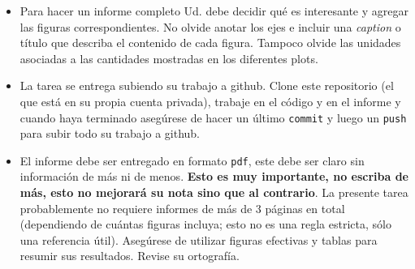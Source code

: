 \documentclass[letter, 11pt]{article}
\begin{document}
\begin{itemize}
\item Para hacer un informe completo Ud. debe decidir qué es interesante y
  agregar las figuras correspondientes. No olvide anotar los ejes e incluir una
  \emph{caption} o título que describa el contenido de cada figura. Tampoco
  olvide las unidades asociadas a las cantidades mostradas en los diferentes
  plots.

\item La tarea se entrega subiendo su trabajo a github. Clone este repositorio
  (el que está en su propia cuenta privada), trabaje en el código y en el
  informe y cuando haya terminado asegúrese de hacer un último \texttt{commit}
  y luego un \texttt{push} para subir todo su trabajo a github.

\item El informe debe ser entregado en formato \texttt{pdf}, este debe ser
  claro sin información de más ni de menos. \textbf{Esto es muy importante, no
  escriba de más, esto no mejorará su nota sino que al contrario}. La presente
  tarea probablemente no requiere informes de más de 3 páginas en total
  (dependiendo de cuántas figuras incluya; esto no es una regla estricta, sólo
  una referencia útil).  Asegúrese de utilizar figuras efectivas y tablas para
  resumir sus resultados. Revise su ortografía.

\end{itemize}

\end{document}
